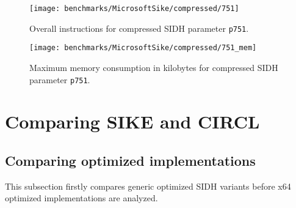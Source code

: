 \begin{figure}[H]
  \centering
  \texttt{[image: benchmarks/MicrosoftSike/compressed/751]}
  \caption[Overall instructions compressed p751]
  {Overall instructions for compressed \gls{SIDH} parameter \texttt{p751}.}
  \label{fig:results_comp_751}
\end{figure}

\begin{figure}[H]
  \centering
  \texttt{[image: benchmarks/MicrosoftSike/compressed/751\_mem]}
  \caption[Maximum memory consumption compressed p751]
  {Maximum memory consumption in kilobytes for compressed \gls{SIDH} parameter \texttt{p751}.}
  \label{fig:results_comp_751_mem}
\end{figure}

\section{Comparing \gls{SIKE} and \gls{CIRCL}} \label{sec:sike_vs_circl}


\subsection{Comparing optimized implementations}\label{sec:analysis_optimized}
This subsection firstly compares generic optimized \gls{SIDH} variants before x64 optimized implementations are analyzed.
